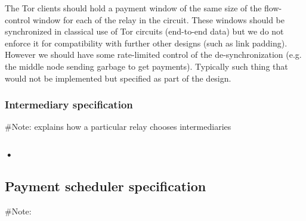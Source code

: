 \documentclass{article}
\begin{document}
 	The Tor clients should hold a payment window of the same size of the flow-control window for each of the relay in the circuit. These windows should be synchronized in classical use of Tor circuits (end-to-end data) but we do not enforce it for compatibility with further other designs (such as link padding). However we should have some rate-limited control of the de-synchronization (e.g. the middle node sending garbage to get payments). Typically such thing that would not be implemented but specified as part of the design.

 \subsubsection{Intermediary specification}
 	\#Note: explains how a particular relay chooses intermediaries

 \subsubsection{•}
\subsection{Payment scheduler specification}
	\#Note:
\end{document}
